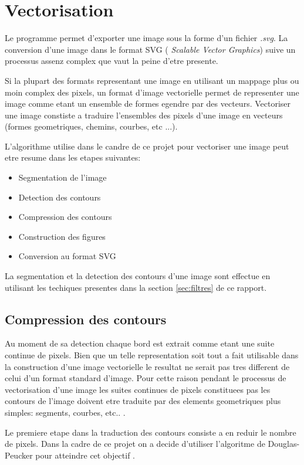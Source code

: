 \documentclass[twoside,openright,a4paper,11pt,french]{article}
\begin{document}
\newpage

\section{Vectorisation} 
Le programme permet d'exporter une image sous la forme d'un fichier
{\it .svg}. La conversion d'une image dans le format SVG ({\it
Scalable Vector Graphics}) suive un processus assenz complex que vaut
la peine d'etre presente.

Si la plupart des formats representant une image en utilisant un 
mappage plus ou moin complex des pixels, un format d'image vectorielle
permet de representer une image comme etant un ensemble de formes
egendre par des vecteurs. Vectoriser une image constiste a traduire
l'ensembles des pixels d'une image en vecteurs (formes geometriques,
chemins, courbes, etc ...).

L'algorithme utilise dans le candre de ce projet pour vectoriser une
image peut etre resume dans les etapes suivantes:   

\smallbreak
\begin{itemize}
\item Segmentation de l'image
\item Detection des contours 
\item Compression des contours
\item Construction des figures
\item Conversion au format SVG
\end{itemize}   
\bigbreak

La segmentation et la detection des contours d'une image sont effectue
en utilisant les techiques presentes dans la section
\ref{sec:filtres} de ce rapport.


\subsection{Compression des contours}
Au moment de sa detection chaque bord est extrait comme etant une
suite continue de pixels. Bien que un telle representation soit tout a
fait utilisable dans la construction d'une image vectorielle le
resultat ne serait pas tres different de celui d'un format standard
d'image. Pour cette raison pendant le processus de vectorisation d'une
image les suites continues de pixels constituees pas les contours de
l'image doivent etre traduite par des elements geometriques plus
simples: segments, courbes, etc.. .  

Le premiere etape dans la traduction des contours consiste a en reduir
le nombre de pixels. Dans la cadre de ce projet on a decide d'utiliser
l'algoritme de Douglas-Peucker pour atteindre cet objectif
\cite{url-dougpeuck}.
\end{document}
